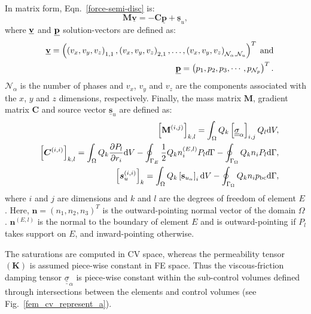 In matrix form, Eqn.~\ref{force-semi-disc} is: 
\begin{equation}
  {\mathbf M} \underline {\mathbf v} = -{\mathbf C} \underline{\mathbf p} + \underline {\mathbf s}_{u}, \label{force-balance-matrix-form}
\end{equation}
where $\underline{\bf v}$ and $\underline{\bf p}$ solution-vectors are defined as:
\begin{eqnarray}
    &&\underline{{\bf v}} = \left( \left( {v_x},{v_y},{v_z} \right)_{1,1}, \left( {v_x},{v_y},{v_z} \right)  _{2,1},\ldots, \left( {v_x},{v_y},{v_z} \right)_{\mathcal{N}_\alpha,\mathcal{N}_u} \right)^{T} \;\text{and} \nonumber \\ 
    && \underline{{\bf p}} = \left(p_1, p_2, p_3, \cdots, p_{\mathcal{N}_p}\right)^T. \nonumber%
\end{eqnarray}
$\mathcal{N}_{\alpha}$ is the number of phases and $v_x$, $v_y$ and $v_z$ are the components associated with the $x$, $y$ and $z$ dimensions, respectively. Finally, the mass matrix ${\mathbf M}$, gradient matrix ${\mathbf C}$ and source vector $\underline {\mathbf s}_{u}$ are defined as:
\begin{eqnarray}
     && \left[{\mathbf M}^{(i,j)}\right]_{k,l} = \int_{\Omega} Q_{k} \left[\underline{\underline{\sigma}}_{\alpha}\right]_{i,j} {Q}_{l} \mathrm{d} V, \nonumber \\ 
     && {\left[\bm{C}^{(i,i)}\right]_{k,l} = \int_{\Omega} Q_{k} \frac{\partial P_{l}}{\partial r_i} \mathrm{d} V - \oint_{\Gamma_{E}} \displaystyle\frac{1}{2} Q_{k} n_i^{(E,l)} P_{l} d\Gamma - \oint_{\Gamma_{\Omega}} \displaystyle Q_{k} n_i P_{l} \mathrm{d}\Gamma}, \nonumber \\ 
     && {\left[\bm{s}_{u}^{(i,i)}\right]_{k} = \int_{\Omega} Q_k}\left[{\mathbf s}_{u_\alpha} \right]_i \mathrm{d} V - \oint_{\Gamma_{\Omega}}\displaystyle Q_{k} n_i p_\text{bc} \mathrm{d}\Gamma, \nonumber
\end{eqnarray}
where $i$ and $j$ are dimensions and $k$ and $l$ are the degrees of freedom of element $E$. Here, $\bm{n} = \left(n_{1}, n_{2}, n_{3}\right)^{T}$ is the outward-pointing normal vector of the domain $\Omega$. $\bm{n}^{(E,l)}$ is the normal to the boundary of element $E$ and is outward-pointing if $P_{l}$ takes support on $E$, and inward-pointing otherwise.

\medskip

The saturations are computed in CV space, whereas the permeability tensor $\left(\mathbf{K}\right)$ is assumed piece-wise constant in FE space. Thus the viscous-friction damping tensor $ {\underline {\underline \sigma}}_{\alpha}$ is piece-wise constant within the sub-control volumes defined through intersections between the elements and control volumes (see Fig.~\ref{fem_cv_represent_a}).



